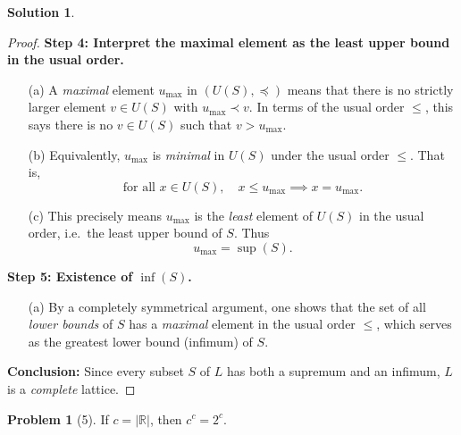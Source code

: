 \documentclass[12pt]{article}
\theoremstyle{definition} %
\newtheorem{solution}{Solution}
\newtheorem{problem}{Problem}
\theoremstyle{plain} %
\begin{document}
\begin{solution}
\begin{proof}
        \vspace{0.3cm}
        \textbf{Step 4: Interpret the maximal element as the least upper bound in the usual order.}
        \begin{enumerate}
            \item[(a)] A \emph{maximal} element $u_{\mathrm{max}}$ in $(U(S), \preceq)$ means that there is no strictly larger element $v \in U(S)$ with $u_{\mathrm{max}} \prec v$. In terms of the usual order $\le$, this says there is no $v \in U(S)$ such that $v > u_{\mathrm{max}}$.
            \item[(b)] Equivalently, $u_{\mathrm{max}}$ is \emph{minimal} in $U(S)$ under the usual order $\le$. That is,
            \[
               \text{for all } x \in U(S), \quad x \le u_{\mathrm{max}} \implies x = u_{\mathrm{max}}.
            \]
            \item[(c)] This precisely means $u_{\mathrm{max}}$ is the \emph{least} element of $U(S)$ in the usual order, i.e.\ the least upper bound of $S$. Thus 
            \[
               u_{\mathrm{max}} = \sup(S).
            \]
        \end{enumerate}
        
        \vspace{0.3cm}
        \textbf{Step 5: Existence of $\inf(S)$.}
        \begin{enumerate}
            \item[(a)] By a completely symmetrical argument, one shows that the set of all \emph{lower bounds} of $S$ has a \emph{maximal} element in the usual order $\le$, which serves as the greatest lower bound (infimum) of $S$.
        \end{enumerate}
        
        \vspace{0.3cm}
        \textbf{Conclusion:} 
        Since every subset $S$ of $L$ has both a supremum and an infimum, $L$ is a \emph{complete} lattice.
        
        \end{proof}

    \end{solution}
    \begin{problem}[5]
        \label{thm:cc_equals_2c}
        If $c = |\mathbb{R}|$, then $c^c = 2^c$.
    \end{problem}
\end{document}
